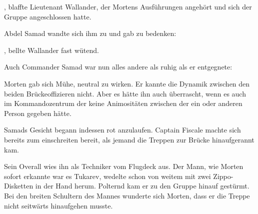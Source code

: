 \par

, blaffte Lieutenant Wallander, der Mortens Ausführungen angehört und sich der Gruppe angeschlossen hatte.

\par

Abdel Samad wandte sich ihm zu und gab zu bedenken: 

\par

, bellte Wallander fast wütend. 

\par

Auch Commander Samad war nun alles andere als ruhig als er entgegnete: 

\par

Morten gab sich Mühe, neutral zu wirken. Er kannte die Dynamik zwischen den beiden Brückeoffizieren nicht. Aber es hätte ihn auch überrascht, wenn es auch im Kommandozentrum der  keine Animositäten zwischen der ein oder anderen Person gegeben hätte.

\par

Samads Gesicht begann indessen rot anzulaufen. Captain Fiscale machte sich bereits zum einschreiten bereit, als jemand die Treppen zur Brücke hinaufgerannt kam.

\par

Sein Overall wies ihn als Techniker vom Flugdeck aus. Der Mann, wie Morten sofort erkannte war es Tukarev, wedelte schon von weitem mit zwei Zippo-Disketten in der Hand herum. Polternd kam er zu den Gruppe hinauf gestürmt. Bei den breiten Schultern des Mannes wunderte sich Morten, dass er die Treppe nicht seitwärts hinaufgehen musste.

\par

